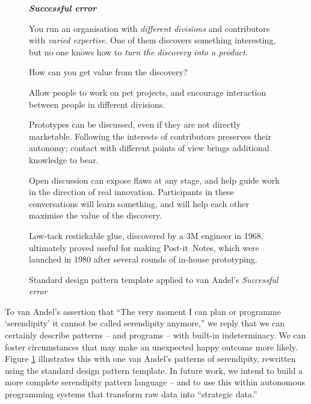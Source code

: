 \begin{figure}[!h]
\begin{mdframed}
\vspace{2mm}
\textbf{\emph{Successful error}}~
\begin{description}[leftmargin=0\parindent,labelindent=0em,itemsep=2pt]
\item[{Context.}] You run an organisation with {\sl different
  divisions} and contributors with {\sl varied expertise}.  One of
  them discovers something interesting, but no one knows how to {\sl
    turn the discovery into a product}.
\item[{Problem.}]  How can you get value from the discovery?
\item[{Solution.}] Allow people to work on pet projects, and encourage
  interaction between people in different divisions.
\item[{Rationale.}] Prototypes can be discussed, even if they are not
  directly marketable.  Following the interests of contributors
  preserves their autonomy; contact with different points of view
  brings additional knowledge to bear.
\item[{Resolution.}] 
Open discussion can
  expose flaws at any stage, and help guide work in the direction of
  real innovation.  Participants in these conversations
  will learn something, and will help each other maximise the value of
  the discovery.  
\item[{Example.}] Low-tack restickable glue, discovered by a 3M
  engineer in 1968, ultimately proved useful for making
  Post-it\texttrademark\ Notes, which were launched in 1980 after
  several rounds of in-house prototyping.
\end{description}
\vspace{-1mm}
\end{mdframed}
\caption{Standard design pattern template applied to van Andel's \em{Successful error}\label{fig:va-pattern-figure}}
\end{figure}



 To van Andel's assertion that ``The very moment I can
plan or programme `serendipity' it cannot be called serendipity
anymore,'' we reply that we can certainly describe patterns -- and
programs -- with built-in indeterminacy.  We can foster circumstances
that may make an unexpected happy outcome more likely.  Figure
\ref{fig:va-pattern-figure} illustrates this with one van Andel's
patterns of serendipity, rewritten using the standard design pattern
template.  In future work, we intend to build a more complete
serendipity pattern language -- and to use this within autonomous
programming systems that transform raw data into ``strategic data.''


